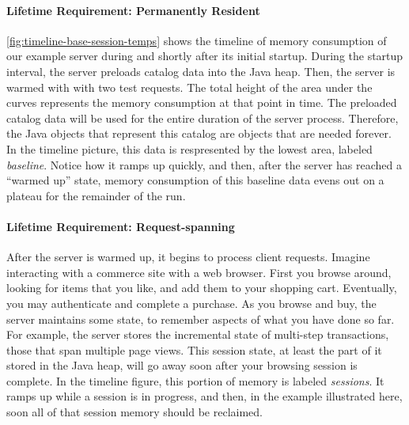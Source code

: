 \paragraph{Lifetime Requirement: Permanently Resident}
\autoref{fig:timeline-base-session-temps} shows the timeline of memory
consumption of our example server 
during and shortly after its initial startup.
During the startup interval, the server preloads catalog data into
the Java heap. Then, the server is warmed with with two test requests.
The total height of the area
under the curves represents the memory consumption at that point in time. 
The preloaded catalog
data will be used for the entire duration of the server process.
Therefore, the Java objects that represent this catalog are objects that are
needed forever. In the timeline picture, this data is respresented by the lowest area, labeled
\emph{baseline}. Notice how it ramps up quickly, and then, after the server has
reached a ``warmed up'' state, memory consumption of this baseline data evens out
on a plateau for the remainder of the run.

\paragraph{Lifetime Requirement: Request-spanning}
After the server is warmed up, it begins to process client requests. Imagine
interacting with a commerce site with a web browser. First you browse around,
looking for items that you like, and add them to your shopping cart. Eventually,
you may authenticate and complete a purchase. As you browse and buy, the server
maintains some state, to remember aspects of what you have done so far. For
example, the server stores the incremental state of multi-step transactions,
those that span multiple page views.
 This session
state, at least the part of it stored in the Java heap, will go away soon after
your browsing session is complete. In the timeline figure, this portion of memory
is labeled \emph{sessions}. It ramps up while a session is in progress, and then,
in the example illustrated here, soon all of that session memory should be
reclaimed.

